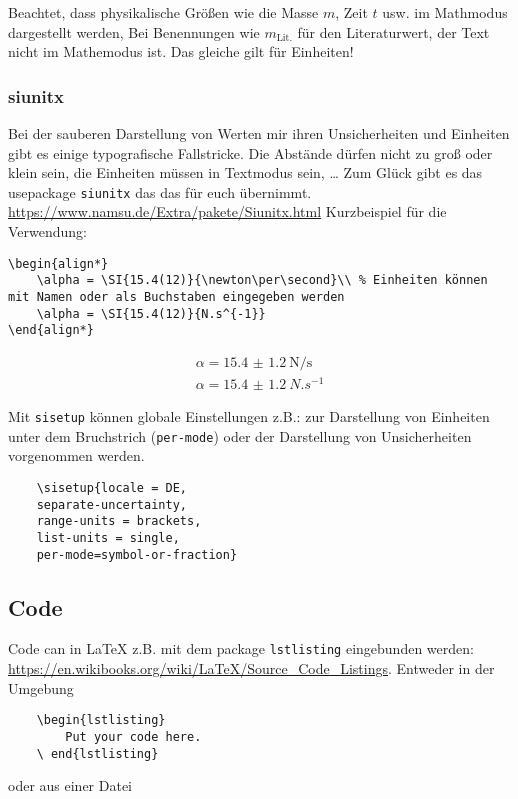 \documentclass[twoside, 11pt, ngerman, a4paper, biblography=totoc]{article}
\begin{document}
Beachtet, dass physikalische Größen wie die Masse $m$, Zeit $t$ usw. im Mathmodus dargestellt werden, Bei Benennungen wie $m_\text{Lit.}$ für den Literaturwert, der Text nicht im Mathemodus ist. Das gleiche gilt für Einheiten!

\subsubsection{siunitx}
Bei der sauberen Darstellung von Werten mir ihren Unsicherheiten und Einheiten gibt es einige typografische Fallstricke. Die Abstände dürfen nicht zu groß oder klein sein, die Einheiten müssen in Textmodus sein, \dots
Zum Glück gibt es das usepackage \texttt{siunitx} das das für euch übernimmt. \href{https://www.namsu.de/Extra/pakete/Siunitx.html}{https://www.namsu.de/Extra/pakete/Siunitx.html}
%
Kurzbeispiel für die Verwendung:
\begin{lstlisting}
\begin{align*}
	\alpha = \SI{15.4(12)}{\newton\per\second}\\ % Einheiten können mit Namen oder als Buchstaben eingegeben werden
	\alpha = \SI{15.4(12)}{N.s^{-1}}
\end{align*}
\end{lstlisting}
\begin{align*}
	\alpha = \SI{15.4(12)}{\newton\per\second}\\ %
	\alpha = \SI{15.4(12)}{N.s^{-1}}
\end{align*}

Mit \texttt{sisetup} können globale Einstellungen z.B.: zur Darstellung von Einheiten unter dem Bruchstrich (\texttt{per-mode}) oder der Darstellung von Unsicherheiten vorgenommen werden.
\begin{lstlisting}
	\sisetup{locale = DE,  
	separate-uncertainty,  
	range-units = brackets,  
	list-units = single,  
	per-mode=symbol-or-fraction}  
\end{lstlisting}

\subsection{Code}
Code can in LaTeX z.B. mit dem package \texttt{lstlisting} eingebunden werden: \href{https://en.wikibooks.org/wiki/LaTeX/Source_Code_Listings}{https://en.wikibooks.org/wiki/LaTeX/Source\_Code\_Listings}. Entweder in der Umgebung
\begin{lstlisting}
	\begin{lstlisting}
		Put your code here.
	\ end{lstlisting}
\end{lstlisting}
oder aus einer Datei 
\begin{lstlisting}
	
\end{lstlisting}
\end{document}
